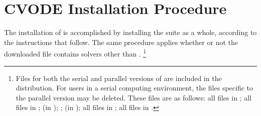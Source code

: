 \chapter{CVODE Installation Procedure}\label{s:install}

The installation of {\cvode} is accomplished by installing the
{\sundials} suite as a whole, according to the instructions that
follow.   The same procedure applies whether or not the downloaded
file contains solvers other than {\cvode}.
\footnote{Files for both the serial and parallel versions of {\cvode}
are included in the distribution.  For users in a serial computing
environment, the files specific to the parallel version may be deleted. 
These files are as follows:
all files in ; all files in ;
 (in );
; 
 (in );
all files in ;
all files in .}



